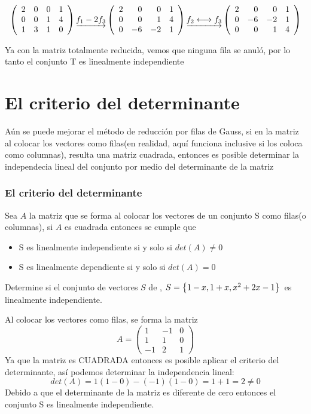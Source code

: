 \[
\reducir{rrrr}{
2&0&0&1\\
0&0&1&4\\
1&3&1&0
}
\underrightarrow{f_1 - 2f_3}
\reducir{rrrr}{
2&0&0&1\\
0&0&1&4\\
0&-6&-2&1
}
\underrightarrow{f_2 \longleftrightarrow f_3}
\reducir{rrrr}{
2&0&0&1\\
0&-6&-2&1\\
0&0&1&4
}
\]

Ya con la matriz totalmente reducida, vemos que ninguna fila se anul\'o, por lo tanto el conjunto T es linealmente independiente
\section{El criterio del determinante}
A\'un se puede mejorar el método de reducción por filas de Gauss, si en la matriz al colocar los vectores como filas(en realidad, aqu\'i funciona inclusive si los coloca como columnas), resulta una matriz cuadrada, entonces es posible determinar la independecia lineal del conjunto por medio del determinante de la matriz

\subsubsection{El criterio del determinante}
\begin{theorem}
Sea $A$ la matriz que se forma al colocar los vectores de un conjunto S como filas(o columnas), si $A$ es cuadrada entonces se cumple que 
\begin{itemize}
\item S es linealmente independiente si y solo si $det(A)\neq 0$
\item S es linealmente dependiente si y solo si $det(A)=0$
\end{itemize}

\end{theorem}


\begin{ejemplo}
Determine si el conjunto de vectores $S$ de \pdos, $S=\llav{1-x, 1+x, x^2+2x-1}$\ es linealmente independiente.
\end{ejemplo}

Al colocar los vectores como filas, se forma la matriz
\[A=
\left(
\begin{array}{rrr}
1&-1&0\\
1&1&0\\
-1&2&1
\end{array}
\right)
\]
Ya que la matriz es CUADRADA entonces es posible aplicar el criterio del determinante, así podemos determinar la independencia lineal:
\[det(A)=1(1-0)-(-1)(1-0)=1+1=2\neq 0\]
Debido a que el determinante de la matriz es diferente de cero entonces el conjunto S es linealmente independiente.
~\\
~\\



